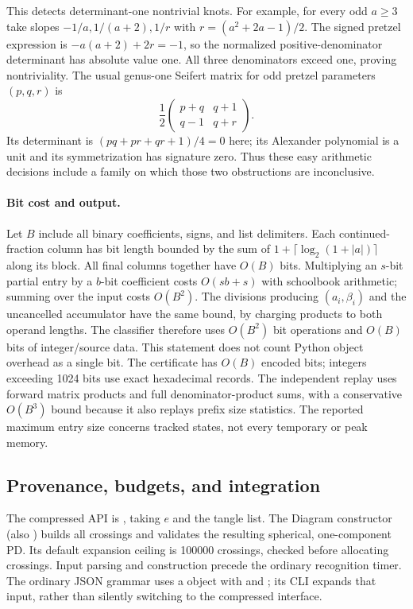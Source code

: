 This detects determinant-one nontrivial knots.  For example, for every odd
$a\ge3$ take slopes $-1/a,1/(a+2),1/r$ with
$r=(a^2+2a-1)/2$.  The signed pretzel expression is
$-a(a+2)+2r=-1$, so the normalized positive-denominator determinant has
absolute value one.  All three denominators exceed one, proving nontriviality.
The usual genus-one Seifert matrix for odd pretzel parameters $(p,q,r)$ is
\[
 \frac12\begin{pmatrix}p+q&q+1\\q-1&q+r\end{pmatrix}.
\]
Its determinant is $(pq+pr+qr+1)/4=0$ here; its Alexander polynomial is
a unit and its symmetrization has signature zero.  Thus these easy arithmetic
decisions include a family on which those two obstructions are inconclusive.

\paragraph{Bit cost and output.}
Let $B$ include all binary coefficients, signs, and list delimiters.  Each
continued-fraction column has bit length bounded by the sum of
$1+\lceil\log_2(1+|a|)\rceil$ along its block.  All final columns together
have $O(B)$ bits.  Multiplying an $s$-bit partial entry by a $b$-bit coefficient
costs $O(sb+s)$ with schoolbook arithmetic; summing over the input costs
$O(B^2)$.  The divisions producing $(a_i,\beta_i)$ and the uncancelled
accumulator have the same bound, by charging products to both operand lengths.
The classifier therefore uses $O(B^2)$ bit operations and $O(B)$ bits of
integer/source data.  This statement does not count Python object overhead
as a single bit.  The certificate has $O(B)$ encoded bits; integers exceeding
1024 bits use exact hexadecimal records.  The independent replay uses forward
matrix products and full denominator-product sums, with a conservative
$O(B^3)$ bound because it also replays prefix size statistics.  The reported
maximum entry size concerns tracked states, not every temporary or peak memory.

\subsection{Provenance, budgets, and integration}
The compressed API is , taking $e$ and the tangle list.
The Diagram constructor  (also ) builds
all crossings and validates the resulting spherical, one-component PD.
Its default expansion ceiling is 100000 crossings, checked before allocating
crossings.  Input parsing and construction precede the ordinary recognition
timer.  The ordinary JSON grammar uses a  object with
 and ; its CLI expands that input, rather than silently
switching to the compressed interface.

